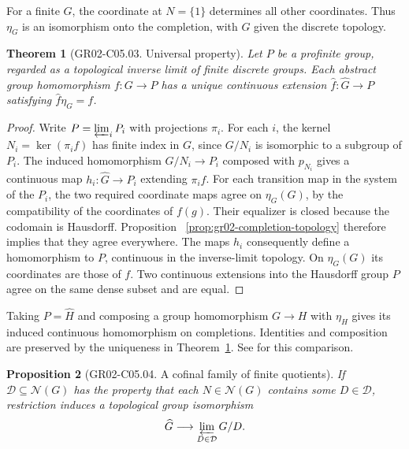 \documentclass[11pt,oneside,openany]{book}
\newtheorem{theorem}{Theorem}[chapter]
\newtheorem{proposition}[theorem]{Proposition}
\theoremstyle{definition}
\theoremstyle{remark}
\begin{document}
For a finite \(G\), the coordinate at \(N=\{1\}\) determines all
other coordinates. Thus \(\eta_G\) is an isomorphism onto the
completion, with \(G\) given the discrete topology.

\begin{theorem}[GR02-C05.03. Universal property]
\label{thm:gr02-completion-universal}
Let \(P\) be a profinite group, regarded as a topological inverse
limit of finite discrete groups. Each abstract group homomorphism
\(f\colon G\to P\) has a unique continuous extension
\(\widehat f\colon\widehat G\to P\) satisfying
\(\widehat f\eta_G=f\).
\end{theorem}

\begin{proof}
Write \(P=\varprojlim_i P_i\) with projections \(\pi_i\). For each
\(i\), the kernel \(N_i=\ker(\pi_i f)\) has finite index in \(G\),
since \(G/N_i\) is isomorphic to a subgroup of \(P_i\).
The induced homomorphism \(G/N_i\to P_i\) composed with \(p_{N_i}\)
gives a continuous map \(h_i\colon\widehat G\to P_i\) extending
\(\pi_i f\). For each transition map in the system of the \(P_i\),
the two required coordinate maps agree on \(\eta_G(G)\), by the
compatibility of the coordinates of \(f(g)\). Their equalizer is
closed because the codomain is Hausdorff. Proposition~%
\ref{prop:gr02-completion-topology} therefore implies that they
agree everywhere. The maps \(h_i\) consequently define a
homomorphism to \(P\), continuous in the inverse-limit topology.
On \(\eta_G(G)\) its coordinates are those of \(f\).
Two continuous extensions into the Hausdorff group \(P\) agree on
the same dense subset and are equal.
\end{proof}

Taking \(P=\widehat H\) and composing a group homomorphism
\(G\to H\) with \(\eta_H\) gives its induced continuous homomorphism
on completions. Identities and composition are preserved by
the uniqueness in Theorem~\ref{thm:gr02-completion-universal}.
See \cite[Proposition 3.1.2]{profinite-source} for this comparison.

\begin{proposition}[GR02-C05.04. A cofinal family of finite quotients]
\label{prop:gr02-completion-cofinal}
If \(\mathcal D\subseteq\mathcal N(G)\) has the property that each
\(N\in\mathcal N(G)\) contains some \(D\in\mathcal D\), restriction
induces a topological group isomorphism
\[
       \widehat G \longrightarrow
       \varprojlim_{D\in\mathcal D}G/D .
\]
\end{proposition}
\end{document}
